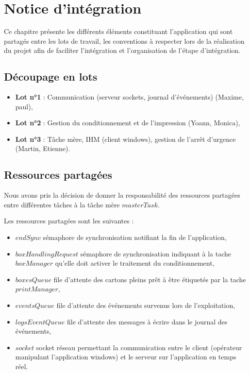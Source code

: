 \chapter{Notice d'intégration}

Ce chapitre présente les différents éléments constituant l'application qui sont
partagés entre les lots de travail, les conventions à respecter lors de la
réalisation du projet afin de faciliter l'intégration et l'organisation de
l'étape d'intégration.

\section{Découpage en lots}

\begin{itemize}
	\item \textbf{Lot n°1} : Communication (serveur sockets, journal
d'événements) (Maxime, paul),
	\item \textbf{Lot n°2} : Gestion du conditionnement et de l'impression
(Yoann, Monica),
	\item \textbf{Lot n°3} : Tâche mère, IHM (client windows), gestion de
l'arrêt d'urgence (Martin, Etienne).
\end{itemize}

\section{Ressources partagées}

Nous avons pris la décision de donner la responsabilité des ressources
partagées entre différentes tâches à la tâche mère $masterTask$.

Les ressources partagées sont les suivantes :

\begin{itemize}
	\item $endSync$ sémaphore de synchronisation notifiant la fin de
l'application,
	\item $boxHandlingRequest$ sémaphore de synchronisation indiquant à la
tache $boxManager$ qu'elle doit activer le traitement du conditionnement,
	\item $boxesQueue$ file d'attente des cartons pleins prêt à être étiquetés
par la tache $printManager$,
	\item $eventsQueue$ file d'attente des événements survenus lors de
l'exploitation,
	\item $logsEventQueue$ file d'attente des messages à écrire dans le journal
des événements,
	\item $socket$ socket réseau permettant la communication entre le client
(opérateur manipulant l'application windows) et le serveur sur l'application en
temps réel.
\end{itemize}

